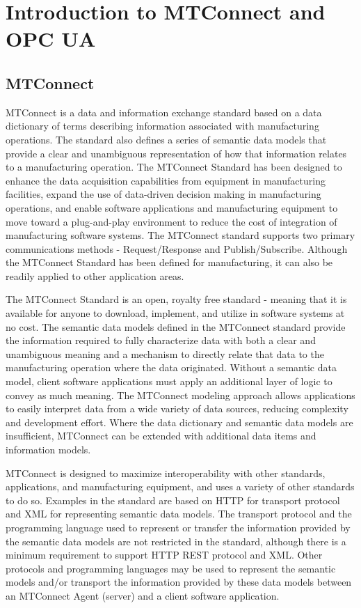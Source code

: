 \section{Introduction to MTConnect and OPC UA}\label{intro}

\subsection{MTConnect}\label{intro-to-mtconnect}
MTConnect is a data and information exchange standard based on a data dictionary of terms describing information associated with manufacturing operations.  The standard also defines a series of semantic data models that provide a clear and unambiguous representation of how that information relates to a manufacturing operation.  The MTConnect Standard has been designed to enhance the data acquisition capabilities from equipment in manufacturing facilities, expand the use of data-driven decision making in manufacturing operations, and enable software applications and manufacturing equipment to move toward a plug-and-play environment to reduce the cost of integration of manufacturing software systems.
The MTConnect standard supports two primary communications methods - Request/Response and Publish/Subscribe.
Although the MTConnect Standard has been defined for manufacturing, it can also be readily applied to other application areas.

The MTConnect Standard is an open, royalty free standard - meaning that it is available for anyone to download, implement, and utilize in software systems at no cost.
The semantic data models defined in the MTConnect standard provide the information required to fully characterize data with both a clear and unambiguous meaning and a mechanism to directly relate that data to the manufacturing operation where the data originated.  Without a semantic data model, client software applications must apply an additional layer of logic to convey as much meaning.  The MTConnect modeling approach allows applications to easily interpret data from a wide variety of data sources, reducing complexity and development effort.
Where the data dictionary and semantic data models are insufficient, MTConnect can be extended with additional data items and information models.

MTConnect is designed to maximize interoperability with other standards, applications, and manufacturing equipment, and uses a variety of other standards to do so. Examples in the standard are based on HTTP for transport protocol and XML for representing semantic data models. The transport protocol and the programming language used to represent or transfer the information provided by the semantic data models are not restricted in the standard, although there is a minimum requirement to support HTTP REST protocol and XML. Other protocols and programming languages may be used to represent the semantic models and/or transport the information provided by these data models between an MTConnect Agent (server) and a client software application.

